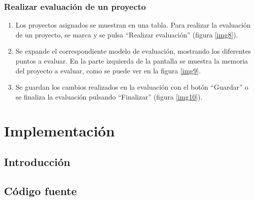 \documentclass[12pt,a4paper,spanish,twoside]{book}
\begin{document}
\subsection{Realizar evaluación de un proyecto}
\begin{enumerate}
\item Los proyectos asignados se muestran en una tabla. Para realizar la 
  evaluación de un proyecto, se marca y se pulsa ``Realizar evaluación''
  (figura \ref{img8}). 


\item Se expande el correspondiente modelo de evaluación, mostrando los 
  diferentes puntos a evaluar. En la parte izquierda de la pantalla se
  muestra la memoria del proyecto a evaluar, como se puede ver en la figura
  \ref{img9}. 


\item Se guardan los cambios realizados en la evaluación con el botón 
  ``Guardar'' o se finaliza la evaluación pulsando ``Finalizar'' (figura 
  \ref{img10}).
  
\end{enumerate}

\chapter{Implementación}
\section{Introducción}

\section{Código fuente}
% 

% 
\end{document}
